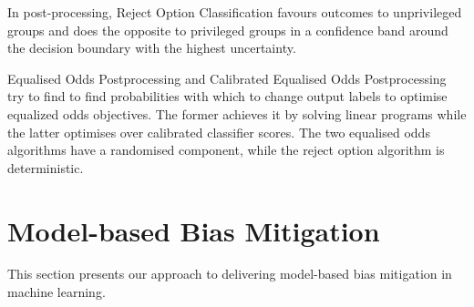 \documentclass[sigconf,review]{acmart}
\begin{document}
	
	
	In post-processing, Reject Option Classification \cite{kamiran2012reject} favours outcomes to unprivileged groups and does the opposite to privileged groups in a confidence band around the decision boundary with the highest uncertainty.
	{Equalised Odds Postprocessing \cite{hardt2016equal,pleiss2017equal} and Calibrated Equalised Odds Postprocessing \cite{pleiss2017equal} try to find to find probabilities with which to change output labels to optimise equalized odds objectives. The former achieves it by solving linear programs while the latter optimises over calibrated classifier scores. The two equalised odds algorithms have a randomised component, while the reject option algorithm is deterministic.
	
	\section{Model-based Bias Mitigation}
	\label{sec:model_based_bias_mitigation}
	
	This section presents our approach to delivering model-based bias mitigation in machine learning. 
	
}
\end{document}
